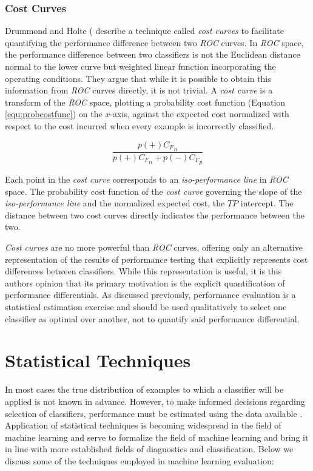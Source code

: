 \documentclass[10pt]{unbthesis}
\begin{document}
\subsubsection{Cost Curves}
Drummond and Holte (\cite{RefWorks:52} describe a technique called
\textit{cost curves} to facilitate quantifying the performance
difference between two \textit{ROC} curves. In \textit{ROC} space, the
performance difference between two classifiers is not the Euclidean
distance normal to the lower curve but weighted linear function
incorporating the operating conditions. They argue that while it
is possible to obtain this information from \textit{ROC} curves
directly, it is not trivial. A \textit{cost curve} is a transform of
the \textit{ROC} space, plotting a probability cost function (Equation
\ref{equ:probcostfunc}) on the \(x\)-axis, against the expected cost
normalized with respect to the cost incurred when every example is
incorrectly classified. 

\begin{equation}
\label{equ:probcostfunc}
\frac{p(+){C_F}_n}{p(+){C_F}_n + p(-){C_F}_p}
\end{equation}

Each point in the \textit{cost curve} corresponds to an
\textit{iso-performance line} in \textit{ROC} space. The probability
cost function of the \textit{cost curve} governing the slope of the
\textit{iso-performance line} and the normalized expected cost, the
\(TP\) intercept. The distance between two cost curves directly
indicates the performance between the two. 

\textit{Cost curves} are no more powerful than \textit{ROC} curves,
offering only an alternative representation of the results of
performance testing that explicitly represents cost differences
between classifiers. While this representation is useful, it is this
authors opinion that its primary motivation is the explicit
quantification of performance differentials. As discussed previously,
performance evaluation is a statistical estimation exercise and should
be used qualitatively to select one classifier as optimal over
another, not to quantify said performance differential.

\section{Statistical Techniques}
In most cases the true distribution of examples to which a classifier
will be applied is not known in advance. However, to make informed decisions
regarding selection of classifiers,
performance must be estimated using the data available
\cite{RefWorks:45}. Application of statistical techniques is
becoming  widespread in the field of machine learning and serve to
formalize the field of machine learning and bring it
 in line with more established fields of diagnostics and
classification. Below we discuss some of the techniques employed in
machine learning evaluation:
\end{document}
